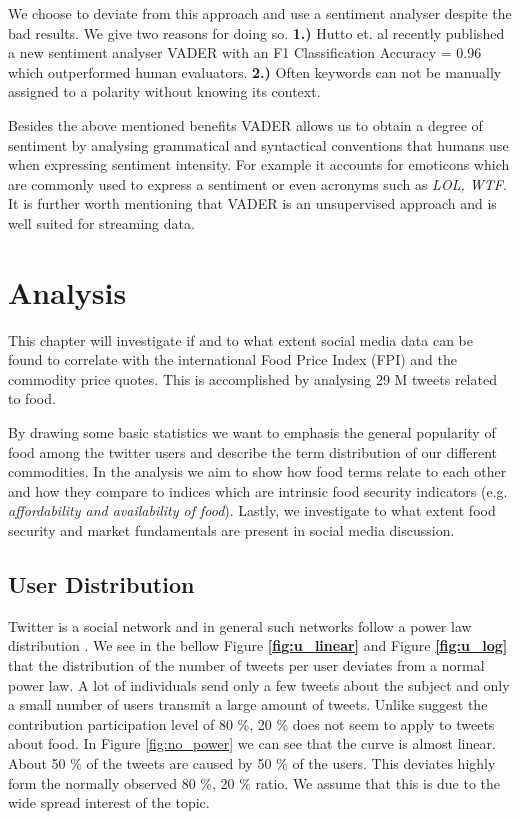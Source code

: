 We choose to deviate from this approach and use a sentiment analyser despite the bad results. We give two reasons for doing so. \textbf{1.)} Hutto et. al recently published a new sentiment analyser VADER \cite{hutton14} with an F1 Classification Accuracy = 0.96 which  outperformed human evaluators. \textbf{2.)} Often keywords can not be manually assigned to a polarity without knowing its context. 

Besides the above mentioned benefits VADER allows us to obtain a degree of sentiment by analysing grammatical and syntactical conventions that humans use when expressing sentiment intensity. For example it accounts for emoticons which are commonly used to express a sentiment or even acronyms such as \emph{LOL, WTF}. It is further worth mentioning that VADER is an unsupervised approach and is well suited for streaming data. 






\chapter{Analysis}

This chapter will investigate if and to what extent social media data can be found to correlate with the international Food Price Index (FPI) and the commodity price quotes. This is accomplished by analysing 29 M tweets related to food. 

By drawing some basic statistics we want to emphasis the general popularity of food among the twitter users and describe the term distribution of our different commodities. In the analysis we aim to show how food terms relate to each other and how they compare to indices which are intrinsic food security indicators (e.g. \emph {affordability and availability of food}). Lastly, we investigate to what extent food security and market fundamentals are present in social media discussion. 


\section {User Distribution}

Twitter is a social network and in general such networks follow a power law distribution \cite{Whittaker:1998}. We see in the bellow Figure \textbf{\ref{fig:u_linear}} and Figure \textbf{\ref{fig:u_log}}  that the distribution of the number of tweets per user deviates from a normal power law. A lot of individuals  send only a few tweets about the subject and only a small number of users transmit a large amount of tweets. Unlike \cite{bild15} suggest the contribution participation level of  80 \%, 20 \%   does not seem to apply to tweets about food. In Figure \ref{fig:no_power} we can see that the curve is almost linear. About 50 \% of the tweets are caused by 50 \% of the users. This deviates highly form the normally observed 80 \%, 20 \% ratio. We assume that this is due to the wide spread interest of the topic.




